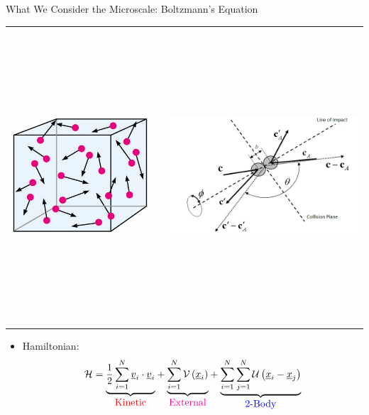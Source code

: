 \documentclass[final,hyperref={pdfpagelabels=false}]{beamer}
\newcommand{\bunderline}[1]{\underline{#1}}
\renewcommand{\vec}[1]{{\bunderline{#1}}}
\newcommand{\inred}[1]
        {\mbox{\color{red} #1}}
\newcommand{\inblu}[1]
        {\mbox{\color{blue} #1}}
\newcommand{\inmag}[1]
        {\mbox{\color{magenta} #1}}
\begin{document}
\begin{frame}[t]
\begin{columns}[t]
\begin{column}{.31\textwidth}
\begin{block}{What We Consider the Microscale: Boltzmann's Equation}
\begin{center}
\begin{tabular}{ccc}
\includegraphics[height=110mm]{gas_particles.jpg} & \hspace{5mm} &
\includegraphics[height=110mm]{collisions.jpg}
\end{tabular}
\end{center}

\begin{itemize}
\item Hamiltonian:
\[
	{\mathcal H} = \underset{\inred{Kinetic}}{\underbrace{\frac{1}{2} \sum_{i=1}^{N} \vec{v}_i \cdot \vec{v}_i}}
	+ \underset{\inmag{External}}{\underbrace{\sum_{i=1}^{N} 
	\mathcal{V}\left( \vec{x}_i \right)}}
	+ \underset{\inblu{2-Body}}{\underbrace{\sum_{i=1}^{N}
	\sum_{j=1}^{N} 
	\mathcal{U}\left( \vec{x}_i - \vec{x}_j \right)}}
\]


\end{itemize}
\end{block}
\end{column}
\end{columns}
\end{frame}
\end{document}
